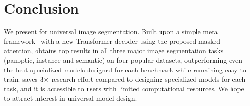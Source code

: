\section{Conclusion}
We present \modelname for universal image segmentation. Built upon a simple meta framework~\cite{cheng2021maskformer} with a new Transformer decoder using the proposed masked attention, \modelname obtains top results in all three major image segmentation tasks (panoptic, instance and semantic) on four popular datasets, outperforming even the best specialized models designed for each benchmark while remaining easy to train. \modelname saves $3\times$ research effort compared to designing specialized models for each task, and it is accessible to users with limited computational resources. We hope to attract interest in universal model design. %
